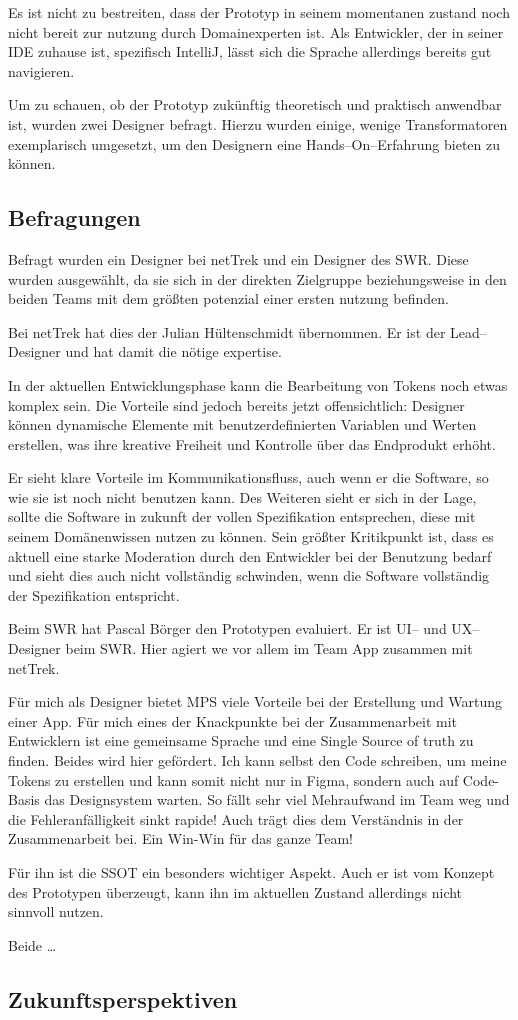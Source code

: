 Es ist nicht zu bestreiten, dass der Prototyp in seinem momentanen zustand noch nicht bereit zur nutzung durch Domainexperten ist.
Als Entwickler, der in seiner \ac{IDE} zuhause ist, spezifisch IntelliJ, lässt sich die Sprache allerdings bereits gut navigieren.

Um zu schauen, ob der Prototyp zukünftig theoretisch und praktisch anwendbar ist, wurden zwei Designer befragt.
Hierzu wurden einige, wenige Transformatoren exemplarisch umgesetzt, um den Designern eine Hands--On--Erfahrung bieten zu können.

\subsection{Befragungen}\label{subsec:befragungen}
Befragt wurden ein Designer bei \ac{netTrek} und ein Designer des \ac{SWR}.
Diese wurden ausgewählt, da sie sich in der direkten Zielgruppe beziehungsweise in den beiden Teams mit dem größten potenzial einer ersten nutzung befinden.

Bei \ac{netTrek} hat dies der Julian Hültenschmidt übernommen.
Er ist der Lead--Designer und hat damit die nötige expertise.
\begin{displayquote}
    In der aktuellen Entwicklungsphase kann die Bearbeitung von Tokens noch etwas komplex sein.
    Die Vorteile sind jedoch bereits jetzt offensichtlich: Designer können dynamische Elemente mit benutzerdefinierten Variablen und Werten erstellen, was ihre kreative Freiheit und Kontrolle über das Endprodukt erhöht.
\end{displayquote}
Er sieht klare Vorteile im Kommunikationsfluss, auch wenn er die Software, so wie sie ist noch nicht benutzen kann.
Des Weiteren sieht er sich in der Lage, sollte die Software in zukunft der vollen Spezifikation entsprechen, diese mit seinem Domänenwissen nutzen zu können.
Sein größter Kritikpunkt ist, dass es aktuell eine starke Moderation durch den Entwickler bei der Benutzung bedarf und sieht dies auch nicht vollständig schwinden, wenn die Software vollständig der Spezifikation entspricht.

Beim \ac{SWR} hat Pascal Börger den Prototypen evaluiert.
Er ist \acs{UI}-- und \acs{UX}--Designer beim \ac{SWR}.
Hier agiert we vor allem im Team App zusammen mit \ac{netTrek}.
\begin{displayquote}
    Für mich als Designer bietet MPS viele Vorteile bei der Erstellung und Wartung einer App.
    Für mich eines der Knackpunkte bei der Zusammenarbeit mit Entwicklern ist eine gemeinsame Sprache und eine Single Source of truth zu finden.
    Beides wird hier gefördert.
    Ich kann selbst den Code schreiben, um meine Tokens zu erstellen und kann somit nicht nur in Figma, sondern auch auf Code-Basis das Designsystem warten.
    So fällt sehr viel Mehraufwand im Team weg und die Fehleranfälligkeit sinkt rapide!
    Auch trägt dies dem Verständnis in der Zusammenarbeit bei.
    Ein Win-Win für das ganze Team!
\end{displayquote}
Für ihn ist die \ac{SSOT} ein besonders wichtiger Aspekt.
Auch er ist vom Konzept des Prototypen überzeugt, kann ihn im aktuellen Zustand allerdings nicht sinnvoll nutzen.

Beide \ldots

\subsection{Zukunftsperspektiven}\label{subsec:zukunftsperspektive}
\lipsum[5]

